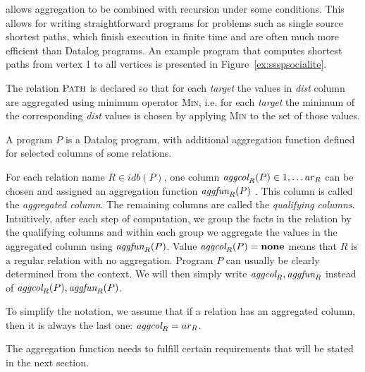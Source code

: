 \datalogra allows aggregation to be combined with recursion under some conditions. This allows for writing straightforward programs for problems such as single source shortest paths, which finish execution in finite time and are often much more efficient than Datalog programs. An example \datalogra program that computes shortest paths from vertex 1 to all vertices is presented in Figure~\ref{ex:ssspsocialite}.



The relation $\textsc{Path}$ is declared so that for each \textit{target} the values in \textit{dist} column are aggregated using minimum operator \textsc{Min}, i.e. for each \textit{target} the minimum of the corresponding \textit{dist} values is chosen by applying \textsc{Min} to the set of those values.

A \datalogra program $P$ is a Datalog program, with additional aggregation function defined for selected columns of some relations. 

For each relation name $R \in idb(P)$, one column $\textit{aggcol}_R(P) \in {1, \dots ar_R}$ can be chosen and assigned an aggregation function $\textit{aggfun}_R(P)$ . This column is called the \emph{aggregated column}. The remaining columns are called the \emph{qualifying columns}. Intuitively, after each step of computation, we group the facts in the relation by the qualifying columns and within each group we aggregate the values in the aggregated column using $\textit{aggfun}_R(P)$. Value $\textit{aggcol}_R(P) = \bf{none}$ means that $R$ is a regular relation with no aggregation. Program $P$ can usually be clearly determined from the context. We will then simply write $\textit{aggcol}_R, \textit{aggfun}_R$ instead of $\textit{aggcol}_R(P), \textit{aggfun}_R(P)$.

To simplify the notation, we assume that if a relation has an aggregated column, then it is always the last one: $\textit{aggcol}_R = ar_R$.

The aggregation function needs to fulfill certain requirements that will be stated in the next section.

